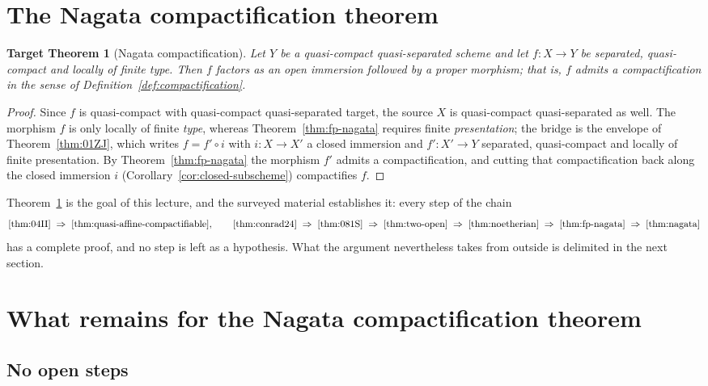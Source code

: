 \documentclass[11pt,a4paper]{article}
\theoremstyle{plain}
\newtheorem{targetthm}[theorem]{Target Theorem}
\theoremstyle{definition}
\theoremstyle{remark}
\newcommand{\qcqs}{quasi-compact quasi-separated}
\begin{document}
\section{The Nagata compactification theorem}
\label{sec:main}

\begin{targetthm}[Nagata compactification]
\label{thm:nagata}
Let $Y$ be a \qcqs{} scheme and let $f\colon X\to Y$ be separated,
quasi-compact and locally of finite type. Then $f$ factors as an open immersion
followed by a proper morphism; that is, $f$ admits a compactification in the
sense of Definition~\ref{def:compactification}.
\end{targetthm}

\begin{proof}
Since $f$ is quasi-compact with \qcqs{} target, the source $X$ is \qcqs{} as
well. The morphism $f$ is only locally of finite \emph{type}, whereas
Theorem~\ref{thm:fp-nagata} requires finite \emph{presentation}; the bridge is
the envelope of Theorem~\ref{thm:01ZJ}, which writes $f=f'\circ i$ with
$i\colon X\to X'$ a closed immersion and $f'\colon X'\to Y$ separated,
quasi-compact and locally of finite presentation. By
Theorem~\ref{thm:fp-nagata} the morphism $f'$ admits a compactification, and
cutting that compactification back along the closed immersion $i$
(Corollary~\ref{cor:closed-subscheme}) compactifies $f$.
\end{proof}

Theorem~\ref{thm:nagata} is the goal of this lecture, and the surveyed material
establishes it: every step of the chain
\[
  \ref{thm:04II}\;\Rightarrow\;\ref{thm:quasi-affine-compactifiable}
  ,\qquad
  \ref{thm:conrad24}\;\Rightarrow\;\ref{thm:081S}\;\Rightarrow\;
  \ref{thm:two-open}\;\Rightarrow\;\ref{thm:noetherian}\;\Rightarrow\;
  \ref{thm:fp-nagata}\;\Rightarrow\;\ref{thm:nagata}
\]
has a complete proof, and no step is left as a hypothesis. What the argument
nevertheless takes from outside is delimited in the next section.

\section{What remains for the Nagata compactification theorem}
\label{sec:remains}

\subsection{No open steps}
\end{document}

